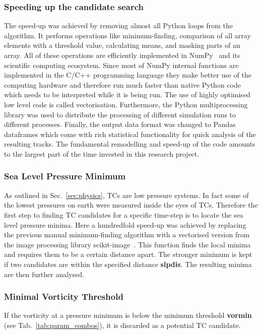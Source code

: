 \subsubsection*{Speeding up the candidate search}
The speed-up was achieved by removing almost all Python loops from the algorithm. It performs operations like minimum-finding, comparison of all array elements with a threshold value, calculating means, and masking parts of an array. All of these operations are efficiently implemented in NumPy~\cite{numpy} and its scientific computing ecosystem. Since most of NumPy internal functions are implemented in the C/C++ programming language they make better use of the computing hardware and therefore run much faster than native Python code which needs to be interpreted while it is being run. The use of highly optimised low level code is called vectorisation.
Furthermore, the Python multiprocessing library was used to distribute the processing of different simulation runs to different processes.\newline
Finally, the output data format was changed to Pandas dataframes which come with rich statistical functionality for quick analysis of the resulting tracks.\newline
The fundamental remodelling and speed-up of the code amounts to the largest part of the time invested in this research project.

\subsubsection*{Sea Level Pressure Minimum}
As outlined in Sec.~\ref{sec:physics}, TCs are low pressure systems. In fact
some of the lowest pressures on earth were measured inside the eyes of TCs.
Therefore the first step to finding TC candidates for a specific time-step is
to locate the sea level pressure minima. Here a hundredfold speed-up was achieved by
replacing the previous manual minimum-finding algorithm with a vectorised
version from the image processing library scikit-image~\cite{scikit-image}.
This function finds the local minima and requires them to be a certain distance
apart. The stronger minimum is kept if two candidates are within the specified
distance \textbf{slpdis}. The resulting minima are then further
analysed.
\subsubsection*{Minimal Vorticity Threshold}
If the vorticity at a pressure minimum is below the minimum threshold
\textbf{vormin} (see Tab.~\ref{tab:param_combos}), it is discarded as a potential TC candidate.


